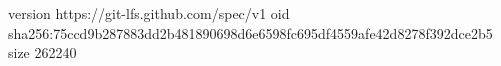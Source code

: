 version https://git-lfs.github.com/spec/v1
oid sha256:75ccd9b287883dd2b481890698d6e6598fc695df4559afe42d8278f392dce2b5
size 262240
